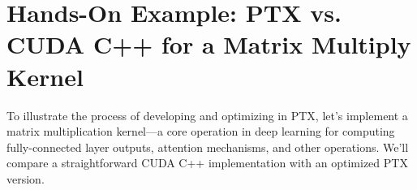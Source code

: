 \section{Hands-On Example: PTX vs. CUDA C++ for a Matrix Multiply Kernel}

To illustrate the process of developing and optimizing in PTX, let's implement a matrix multiplication kernel—a core operation in deep learning for computing fully-connected layer outputs, attention mechanisms, and other operations. We'll compare a straightforward CUDA C++ implementation with an optimized PTX version.

